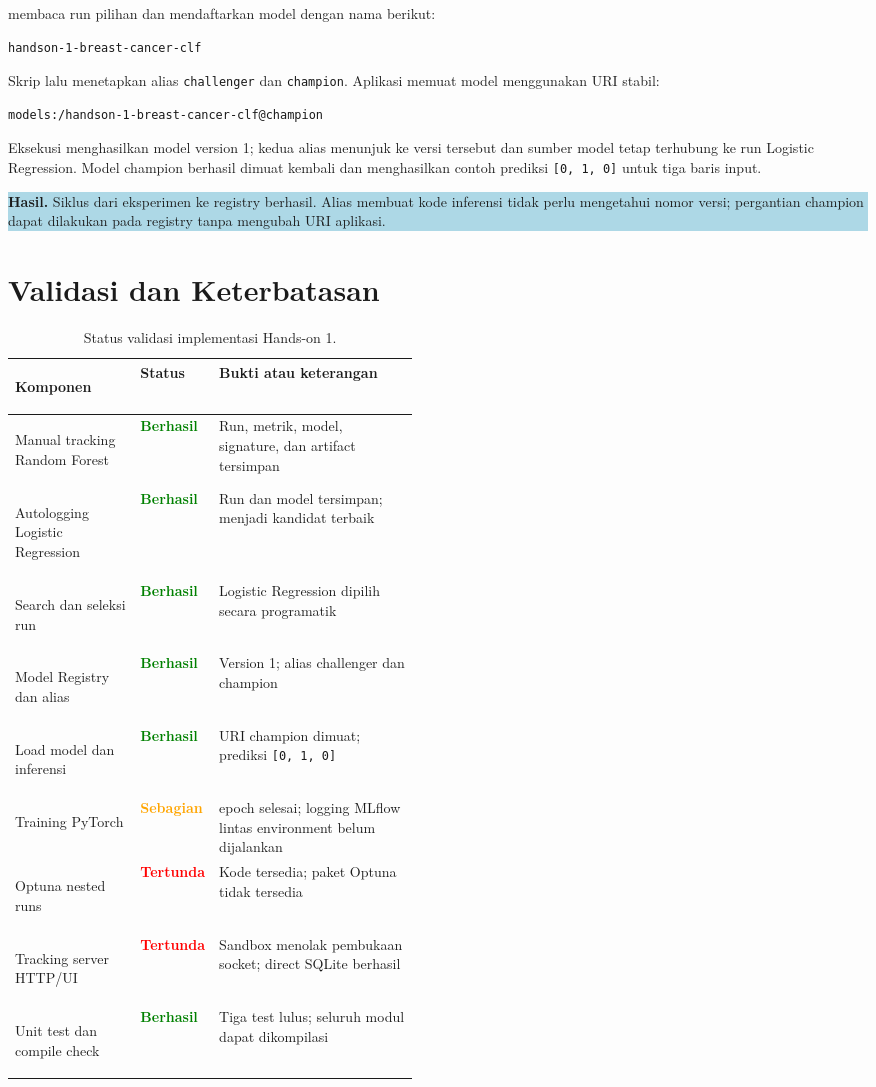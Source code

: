 \documentclass[11pt,a4paper]{article}
\newcommand{\resultbox}[1]{%
  \begin{center}
    \colorbox{lightblue}{\parbox{0.91\linewidth}{\textbf{Hasil.} #1}}
  \end{center}
}
\newcommand{\statusok}{\textcolor{green}{\textbf{Berhasil}}}
\newcommand{\statuspartial}{\textcolor{orange}{\textbf{Sebagian}}}
\newcommand{\statuspending}{\textcolor{red}{\textbf{Tertunda}}}
\begin{document}
 membaca run pilihan dan mendaftarkan model dengan nama berikut:

\begin{lstlisting}[style=terminal]
handson-1-breast-cancer-clf
\end{lstlisting}

Skrip lalu menetapkan alias \texttt{challenger} dan \texttt{champion}. Aplikasi memuat model menggunakan URI stabil:

\begin{lstlisting}[style=terminal]
models:/handson-1-breast-cancer-clf@champion
\end{lstlisting}

Eksekusi menghasilkan model version 1; kedua alias menunjuk ke versi tersebut dan sumber model tetap terhubung ke run Logistic Regression. Model champion berhasil dimuat kembali dan menghasilkan contoh prediksi \texttt{[0, 1, 0]} untuk tiga baris input.

\resultbox{Siklus dari eksperimen ke registry berhasil. Alias membuat kode inferensi tidak perlu mengetahui nomor versi; pergantian champion dapat dilakukan pada registry tanpa mengubah URI aplikasi.}

\section{Validasi dan Keterbatasan}

\begin{table}[ht]
\centering
\small
\caption{Status validasi implementasi Hands-on 1.}
\begin{tabularx}{\linewidth}{>{\bfseries\raggedright\arraybackslash}p{0.31\linewidth}>{\raggedright\arraybackslash}p{0.16\linewidth}>{\raggedright\arraybackslash}X}
\toprule
Komponen & Status & Bukti atau keterangan \\
\midrule
Manual tracking Random Forest & \statusok & Run, metrik, model, signature, dan artifact tersimpan \\
Autologging Logistic Regression & \statusok & Run dan model tersimpan; menjadi kandidat terbaik \\
Search dan seleksi run & \statusok & Logistic Regression dipilih secara programatik \\
Model Registry dan alias & \statusok & Version 1; alias challenger dan champion \\
Load model dan inferensi & \statusok & URI champion dimuat; prediksi \texttt{[0, 1, 0]} \\
Training PyTorch & \statuspartial & 15 epoch selesai; logging MLflow lintas environment belum dijalankan \\
Optuna nested runs & \statuspending & Kode tersedia; paket Optuna tidak tersedia \\
Tracking server HTTP/UI & \statuspending & Sandbox menolak pembukaan socket; direct SQLite berhasil \\
Unit test dan compile check & \statusok & Tiga test lulus; seluruh modul dapat dikompilasi \\
\bottomrule
\end{tabularx}
\end{table}
\end{document}
